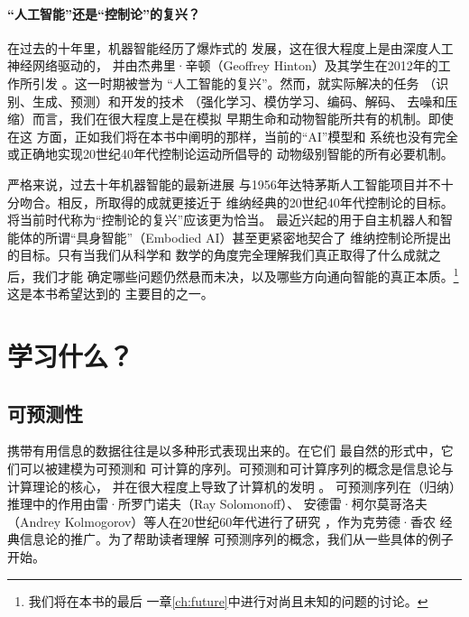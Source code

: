 \documentclass[../../book-main_zh.tex]{subfiles}
\begin{document}
\paragraph{“人工智能”还是“控制论”的复兴？}
在过去的十年里，机器智能经历了爆炸式的
发展，这在很大程度上是由深度人工神经网络驱动的，
并由杰弗里·辛顿（Geoffrey Hinton）及其学生在2012年的工作所引发
\cite{krizhevsky2012imagenet}。这一时期被誉为
“人工智能的复兴”。然而，就实际解决的任务
（识别、生成、预测）和开发的技术
（强化学习、模仿学习、编码、解码、
去噪和压缩）而言，我们在很大程度上是在模拟
早期生命和动物智能所共有的机制。即使在这
方面，正如我们将在本书中阐明的那样，当前的“AI”模型和
系统也没有完全或正确地实现20世纪40年代控制论运动所倡导的
动物级别智能的所有必要机制。

严格来说，过去十年机器智能的最新进展
与1956年达特茅斯人工智能项目并不十分吻合。相反，所取得的成就更接近于
维纳经典的20世纪40年代控制论的目标。将当前时代称为“控制论的复兴”应该更为恰当。
最近兴起的用于自主机器人和智能体的所谓“具身智能”（Embodied AI）甚至更紧密地契合了
维纳控制论所提出的目标。只有当我们从科学和
数学的角度完全理解我们真正取得了什么成就之后，我们才能
确定哪些问题仍然悬而未决，以及哪些方向通向智能的真正本质。\footnote{我们将在本书的最后
一章\ref{ch:future}中进行对尚且未知的问题的讨论。} 这是本书希望达到的
主要目的之一。

\section{学习什么？}
\label{sec:what-to-learn}

\subsection{可预测性}
\label{sec:predictability}
携带有用信息的数据往往是以多种形式表现出来的。在它们
最自然的形式中，它们可以被建模为可预测和
可计算的序列。可预测和可计算序列的概念是信息论\cite{Shannon-1948}与计算理论的核心，
并在很大程度上导致了计算机的发明 \cite{Turing-1936}。
可预测序列在（归纳）推理中的作用由雷·所罗门诺夫（Ray Solomonoff）、
安德雷·柯尔莫哥洛夫（Andrey Kolmogorov）等人在20世纪60年代进行了研究
\cite{Kolmogorov1998OnTO}，作为克劳德·香农
经典信息论的推广。为了帮助读者理解
可预测序列的概念，我们从一些具体的例子开始。
\end{document}
